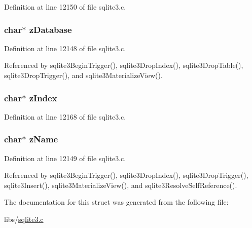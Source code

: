 Definition at line 12150 of file sqlite3.\+c.

\hypertarget{struct_src_list_1_1_src_list__item_a576d35ab74a5170a112731199a571c58}{}
\subsubsection[{z\+Database}]{\setlength{\rightskip}{0pt plus 5cm}char$\ast$ z\+Database}\label{struct_src_list_1_1_src_list__item_a576d35ab74a5170a112731199a571c58}


Definition at line 12148 of file sqlite3.\+c.



Referenced by sqlite3\+Begin\+Trigger(), sqlite3\+Drop\+Index(), sqlite3\+Drop\+Table(), sqlite3\+Drop\+Trigger(), and sqlite3\+Materialize\+View().

\hypertarget{struct_src_list_1_1_src_list__item_adb55e49267d65b0604fe934aab05d569}{}
\subsubsection[{z\+Index}]{\setlength{\rightskip}{0pt plus 5cm}char$\ast$ z\+Index}\label{struct_src_list_1_1_src_list__item_adb55e49267d65b0604fe934aab05d569}


Definition at line 12168 of file sqlite3.\+c.

\hypertarget{struct_src_list_1_1_src_list__item_a661118d86ac4127d40bf3be78d92117d}{}
\subsubsection[{z\+Name}]{\setlength{\rightskip}{0pt plus 5cm}char$\ast$ z\+Name}\label{struct_src_list_1_1_src_list__item_a661118d86ac4127d40bf3be78d92117d}


Definition at line 12149 of file sqlite3.\+c.



Referenced by sqlite3\+Begin\+Trigger(), sqlite3\+Drop\+Index(), sqlite3\+Drop\+Trigger(), sqlite3\+Insert(), sqlite3\+Materialize\+View(), and sqlite3\+Resolve\+Self\+Reference().



The documentation for this struct was generated from the following file\+:\begin{DoxyCompactItemize}
\item 
libs/\hyperlink{sqlite3_8c}{sqlite3.\+c}\end{DoxyCompactItemize}
